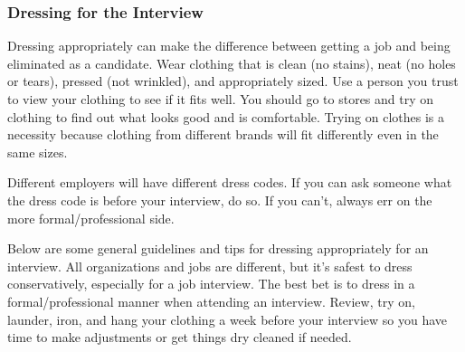 \subsubsection*{Dressing for the Interview}
\break Dressing appropriately can make the difference between getting a job and being eliminated as a candidate. Wear clothing that is clean (no stains), neat (no holes or tears), pressed (not wrinkled), and appropriately sized. Use a person you trust to view your clothing to see if it fits well. You should go to stores and try on clothing to find out what looks good and is comfortable. Trying on clothes is a necessity because clothing from different brands will fit differently even in the same sizes.

Different employers will have different dress codes. If you can ask someone what the dress code is before your interview, do so. If you can't, always err on the more formal/professional side.

Below are some general guidelines and tips for dressing appropriately for an interview. All organizations and jobs are different, but it's safest to dress conservatively, especially for a job interview. The best bet is to dress in a formal/professional manner when attending an interview. Review, try on, launder, iron, and hang your clothing a week before your interview so you have time to make adjustments or get things dry cleaned if needed.

